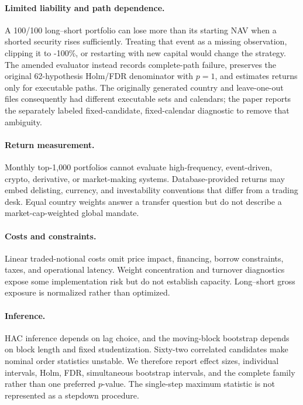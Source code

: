 \documentclass[11pt]{article}
\begin{document}
\paragraph{Limited liability and path dependence.} A 100/100 long--short portfolio can lose more than its starting NAV when a shorted security rises sufficiently. Treating that event as a missing observation, clipping it to -100\%, or restarting with new capital would change the strategy. The amended evaluator instead records complete-path failure, preserves the original 62-hypothesis Holm/FDR denominator with $p=1$, and estimates returns only for executable paths. The originally generated country and leave-one-out files consequently had different executable sets and calendars; the paper reports the separately labeled fixed-candidate, fixed-calendar diagnostic to remove that ambiguity.

\paragraph{Return measurement.} Monthly top-1,000 portfolios cannot evaluate high-frequency, event-driven, crypto, derivative, or market-making systems. Database-provided returns may embed delisting, currency, and investability conventions that differ from a trading desk. Equal country weights answer a transfer question but do not describe a market-cap-weighted global mandate.

\paragraph{Costs and constraints.} Linear traded-notional costs omit price impact, financing, borrow constraints, taxes, and operational latency. Weight concentration and turnover diagnostics expose some implementation risk but do not establish capacity. Long--short gross exposure is normalized rather than optimized.

\paragraph{Inference.} HAC inference depends on lag choice, and the moving-block bootstrap depends on block length and fixed studentization. Sixty-two correlated candidates make nominal order statistics unstable. We therefore report effect sizes, individual intervals, Holm, FDR, simultaneous bootstrap intervals, and the complete family rather than one preferred $p$-value. The single-step maximum statistic is not represented as a stepdown procedure.
\end{document}
